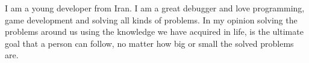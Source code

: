 \documentclass[9pt]{developercv} %
\begin{document}
\vspace{0.5cm}



\begin{minipage}[t]{0.4\textwidth} %
	\vspace{-\baselineskip} %
	
	I am a young developer from Iran. I am a great debugger and love programming, game development and solving all kinds of problems. In my opinion solving the problems around us using the knowledge we 
	have acquired in life, is the ultimate goal that a person can follow, no matter how big or small the solved problems are.
\end{minipage}
\hfill %
\begin{minipage}[t]{0.5\textwidth} %
	\vspace{-\baselineskip} %
	\begin{barchart}{5.5}
	\end{barchart}
\end{minipage}

\begin{center}
\end{center}


\end{document}
